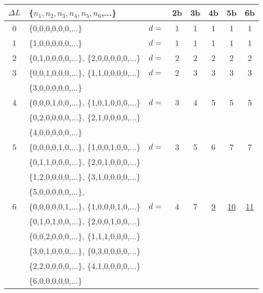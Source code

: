 \begin{table}[h]
\centering
\begin{tabular}{c|l|l c c c c c}
 \hline
 \hline
$\Delta L$ & \{$n_1,n_2,n_3,n_4,n_5,n_6$,...\}        &  &2b &3b &4b &5b &6b  \\
 \hline
 \hline
     0 & \{0,0,0,0,0,0,...\}                          &$d=$  &1 &1 &1 &1  &1  \\

 \hline
     1 & \{1,0,0,0,0,0,...\}                          &$d=$  &1 &1 &1 &1  &1  \\
 \hline
     2 & \{0,1,0,0,0,0,...\},   \{2,0,0,0,0,0,...\}  &$d=$  &2 &2 &2 &2  &2  \\
 \hline
     3 & \{0,0,1,0,0,0,...\},   \{1,1,0,0,0,0,...\}  &$d=$  &2 &3 &3 &3  &3  \\
       & \{3,0,0,0,0,0,...\}                                                 \\
 \hline
     4 & \{0,0,0,1,0,0,...\},   \{1,0,1,0,0,0,...\}  &$d=$  &3 &4 &5 &5  &5  \\
       & \{0,2,0,0,0,0,...\},   \{2,1,0,0,0,0,...\}                         \\
       & \{4,0,0,0,0,0,...\}                                                 \\
 \hline
     5 & \{0,0,0,0,1,0,...\},   \{1,0,0,1,0,0,...\}  &$d=$  &3 &5 &6 &7  &7  \\
       & \{0,1,1,0,0,0,...\},   \{2,0,1,0,0,0,...\}                         \\
       & \{1,2,0,0,0,0,...\},   \{3,1,0,0,0,0,...\}                         \\
       & \{5,0,0,0,0,0,...\},                                                \\
 \hline
     6 & \{0,0,0,0,0,1,...\},   \{1,0,0,0,1,0,...\}  &$d=$  &4 &7 &\underline{9} &\underline{10} &\underline{11} \\
       & \{0,1,0,1,0,0,...\},   \{2,0,0,1,0,0,...\}                         \\
       & \{0,0,2,0,0,0,...\},   \{1,1,1,0,0,0,...\}                         \\
       & \{3,0,1,0,0,0,...\},   \{0,3,0,0,0,0,...\}                         \\
       & \{2,2,0,0,0,0,...\},   \{4,1,0,0,0,0,...\}                         \\
       & \{6,0,0,0,0,0,...\}                                                 \\
 \hline
 \hline
\end{tabular}

\end{table}
